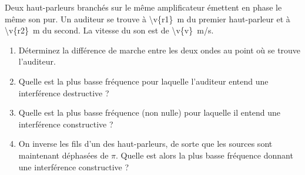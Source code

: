 Deux haut-parleurs branchés sur le même amplificateur émettent en phase le même son pur. Un auditeur se trouve à \qty{\v{r1}}{m} du premier haut-parleur et à \qty{\v{r2}}{m} du second. La vitesse du son est de \qty{\v{v}}{m/s}.

\begin{enumerate}[label=\alph*)]
    \item Déterminez la différence de marche entre les deux ondes au point où se trouve l'auditeur.
    \item Quelle est la plus basse fréquence pour laquelle l'auditeur entend une interférence destructive ?
    \item Quelle est la plus basse fréquence (non nulle) pour laquelle il entend une interférence constructive ?
    \item On inverse les fils d'un des haut-parleurs, de sorte que les sources sont maintenant déphasées de $\pi$. Quelle est alors la plus basse fréquence donnant une interférence constructive ?
\end{enumerate}
